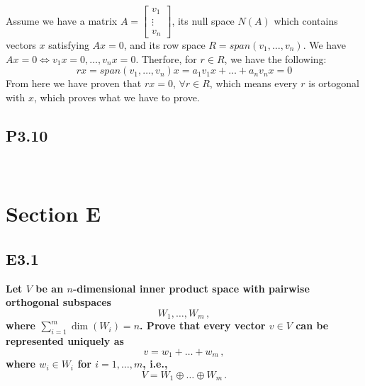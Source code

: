\documentclass[12pt]{article}
\begin{document}
Assume we have a matrix $A = \begin{bmatrix}
v_1\\
\vdots\\
v_n

\end{bmatrix}$, its null space $N(A)$ which contains vectors $x$ satisfying $Ax=0$, and its row space $R = span(v_1,\ldots,v_n)$. We have $Ax = 0 \Leftrightarrow v_1x=0, \ldots, v_nx=0$. Therfore, for $r \in R$, we have the following: $$rx = span(v_1,\ldots,v_n)x = a_1v_1x + \ldots+ a_nv_nx = 0$$
From here we have proven that $rx=0$, $\forall  r \in R$, which means every $r$ is ortogonal with $x$, which proves what we have to prove.




\subsection*{P3.10}
\textbf{}\\




\section*{Section E}
\subsection*{E3.1}
\textbf{Let $V$ be an $n$-dimensional inner product space with pairwise orthogonal subspaces
$$W_1, \dots, W_m\, ,$$
where $\sum_{i=1}^{m} \dim(W_i) = n$.
Prove that every vector $v \in V$ can be represented uniquely as
$$v = w_1 + \dots + w_m \, ,$$
where $w_i \in W_i$ for $i = 1, \dots, m$, i.e.,
$$V = W_1 \oplus \dots \oplus W_m \, .$$}\\
\end{document}
